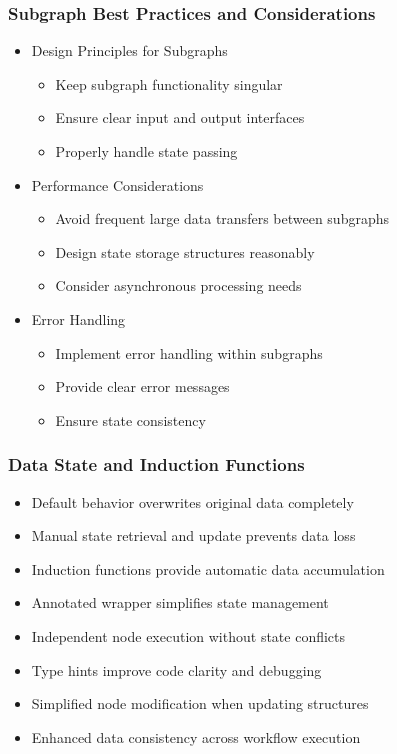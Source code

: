 \begin{frame}[fragile]\frametitle{Subgraph Best Practices and Considerations}

      \begin{itemize}
        \item Design Principles for Subgraphs
		      \begin{itemize}
				\item Keep subgraph functionality singular
				\item Ensure clear input and output interfaces
				\item Properly handle state passing
			  \end{itemize}
				
        \item Performance Considerations
		      \begin{itemize}
				\item Avoid frequent large data transfers between subgraphs
				\item Design state storage structures reasonably
				\item Consider asynchronous processing needs
			  \end{itemize}
				
        \item Error Handling
		      \begin{itemize}
				\item Implement error handling within subgraphs
				\item Provide clear error messages
				\item Ensure state consistency
			  \end{itemize}
				
      \end{itemize}
\end{frame}

\begin{frame}[fragile]\frametitle{Data State and Induction Functions}
      \begin{itemize}
        \item Default behavior overwrites original data completely
        \item Manual state retrieval and update prevents data loss
        \item Induction functions provide automatic data accumulation
        \item Annotated wrapper simplifies state management
        \item Independent node execution without state conflicts
        \item Type hints improve code clarity and debugging
        \item Simplified node modification when updating structures
        \item Enhanced data consistency across workflow execution
      \end{itemize}
\end{frame}

